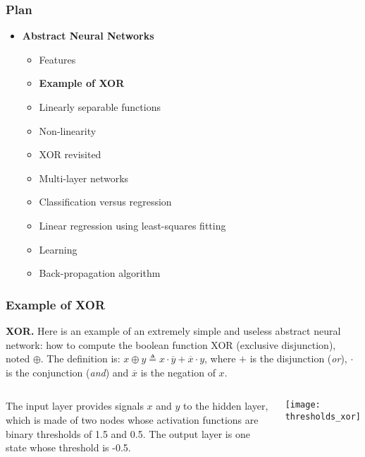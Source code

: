 %
\begin{frame}
\frametitle{Plan}

\begin{itemize}

  \item \textbf{Abstract Neural Networks}

  \begin{itemize}

    \item Features

    \item \textbf{Example of XOR}

    \item Linearly separable functions

    \item Non-linearity

    \item XOR revisited

    \item Multi-layer networks

    \item Classification versus regression

    \item Linear regression using least-squares fitting

    \item Learning

    \item Back-propagation algorithm

  \end{itemize}

\end{itemize}

\end{frame}

%
\begin{frame}
\frametitle{Example of XOR}

\textbf{XOR.} Here is an example of an extremely simple and useless
abstract neural network: how to compute the boolean function XOR
(exclusive disjunction), noted \(\oplus\). The definition is: \(x
\oplus y \triangleq x \cdot \overline{y} + \overline{x} \cdot y\),
where \(+\) is the disjunction (\emph{or}), \(\cdot\) is the
conjunction (\emph{and}) and \(\overline{x}\) is the negation of
\(x\).

\bigskip

\begin{columns}[c]
   The input layer provides signals \(x\) and
  \(y\) to the hidden layer, which is made of two nodes whose
  activation functions are binary thresholds of 1.5 and 0.5. The
  output layer is one state whose threshold is -0.5.
 
    \begin{center}
      \texttt{[image: thresholds\_xor]}
    \end{center}
\end{columns}

\end{frame}

